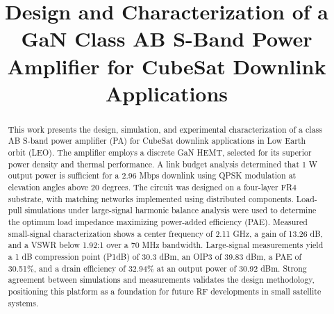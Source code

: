 \documentclass[conference]{IEEEtran}
\begin{document}
\title{Design and Characterization of a GaN Class AB S-Band Power Amplifier for CubeSat Downlink Applications\\

}

\author{
}

\maketitle

\begin{abstract}
This work presents the design, simulation, and experimental characterization of a class AB S-band power amplifier (PA) for CubeSat downlink applications in Low Earth orbit (LEO). The amplifier employs a discrete GaN HEMT, selected for its superior power density and thermal performance. A link budget analysis determined that 1 W output power is sufficient for a 2.96 Mbps downlink using QPSK modulation at elevation angles above 20 degrees. The circuit was designed on a four-layer FR4 substrate, with matching networks implemented using distributed components. Load-pull simulations under large-signal harmonic balance analysis were used to determine the optimum load impedance maximizing power-added efficiency (PAE). Measured small-signal characterization shows a center frequency of 2.11 GHz, a gain of 13.26 dB, and a VSWR below 1.92:1 over a 70 MHz bandwidth. Large-signal measurements yield a 1 dB compression point (P1dB) of 30.3 dBm, an OIP3 of 39.83 dBm, a PAE of 30.51\%, and a drain efficiency of 32.94\% at an output power of 30.92 dBm. Strong agreement between simulations and measurements validates the design methodology, positioning this platform as a foundation for future RF developments in small satellite systems.
\end{abstract}
\end{document}
